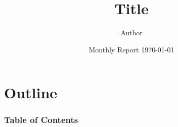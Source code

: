 \documentclass[10.5pt]{beamer}
\title[T]{Title}
\author[Author]{Author\inst{1}}
\date[Monthly Report]{Monthly Report \today}
\institute[*]{\inst{1} ***}
\begin{document}
\begin{frame}[plain]
    \titlepage
\end{frame}

\section*{Outline}
\begin{frame}[allowframebreaks] %
    \frametitle{Table of Contents}
    \tableofcontents[hideallsubsections] %
\end{frame}
\end{document}
